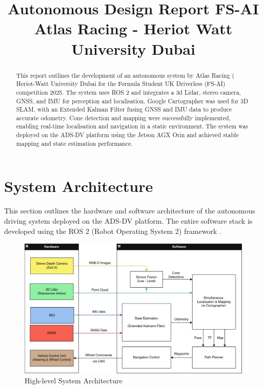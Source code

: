 \documentclass[conference]{IEEEtran}
\begin{document}
\title{Autonomous Design Report FS-AI\\[-0.3em]
{\Large Atlas Racing - Heriot Watt University Dubai}\\[-0.6em]
}

\author{
}

\maketitle

\begin{abstract}
This report outlines the development of an autonomous system by Atlas Racing ( Heriot-Watt University Dubai for the Formula Student UK Driverless (FS-AI) competition 2025. The system uses ROS 2 and integrates a 3d Lidar, stereo camera, GNSS, and IMU for perception and localisation. Google Cartographer was used for 3D SLAM, with an Extended Kalman Filter fusing GNSS and IMU data to produce accurate odometry. Cone detection and mapping were successfully implemented, enabling real-time localisation and navigation in a static environment. The system was deployed on the ADS-DV platform using the Jetson AGX Orin and achieved stable mapping and state estimation performance.
\end{abstract}

\section{System Architecture}
This section outlines the hardware and software architecture of the autonomous driving system deployed on the ADS-DV platform.  The entire software stack is developed using the ROS 2 (Robot Operating System 2) framework \cite{ros2humble}.

\begin{figure}[htbp]
\centerline{\includegraphics[scale=0.21]{images/System Arch.jpeg}}
\caption{High-level System Architecture}
\label{fig}
\end{figure}
\end{document}
